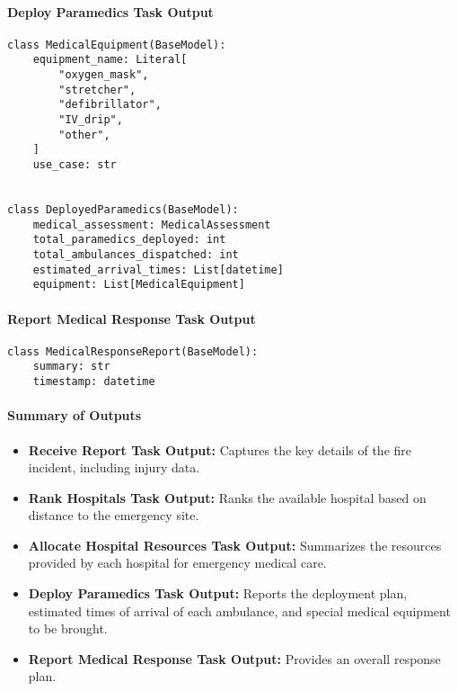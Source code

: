 \paragraph{Deploy Paramedics Task Output}
\begin{lstlisting}[caption={Pydantic model for Deploy Paramedics Task Output}]
class MedicalEquipment(BaseModel):
    equipment_name: Literal[
        "oxygen_mask",
        "stretcher",
        "defibrillator",
        "IV_drip",
        "other",
    ]
    use_case: str


class DeployedParamedics(BaseModel):
    medical_assessment: MedicalAssessment
    total_paramedics_deployed: int
    total_ambulances_dispatched: int
    estimated_arrival_times: List[datetime]
    equipment: List[MedicalEquipment]
\end{lstlisting}

\paragraph{Report Medical Response Task Output}
\begin{lstlisting}[caption={Pydantic model for Report Medical Response Task Output}]
class MedicalResponseReport(BaseModel):
    summary: str
    timestamp: datetime
\end{lstlisting}

\paragraph{Summary of Outputs}
\begin{itemize}
    \item \textbf{Receive Report Task Output:} Captures the key details of the fire incident, including injury data.
    \item \textbf{Rank Hospitals Task Output:} Ranks the available hospital based on distance to the emergency site.
    \item \textbf{Allocate Hospital Resources Task Output:} Summarizes the resources provided by each hospital for emergency medical care.
    \item \textbf{Deploy Paramedics Task Output:} Reports the deployment plan, estimated times of arrival of each ambulance, and special medical equipment to be brought.
    \item \textbf{Report Medical Response Task Output:} Provides an overall response plan.
\end{itemize} 